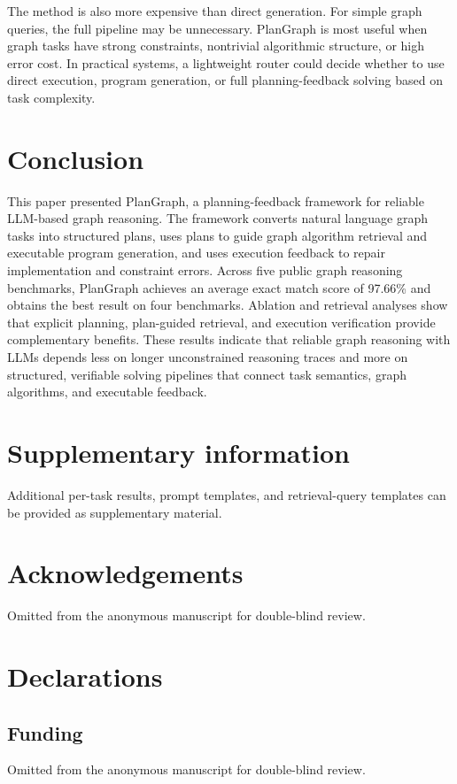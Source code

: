 \documentclass[pdflatex,iicol,sn-mathphys-num]{sn-jnl}
\theoremstyle{thmstyleone}
\theoremstyle{thmstyletwo}
\theoremstyle{thmstylethree}
\begin{document}
The method is also more expensive than direct generation. For simple graph queries, the full pipeline may be unnecessary. PlanGraph is most useful when graph tasks have strong constraints, nontrivial algorithmic structure, or high error cost. In practical systems, a lightweight router could decide whether to use direct execution, program generation, or full planning-feedback solving based on task complexity.

\section{Conclusion}\label{sec:conclusion}

This paper presented PlanGraph, a planning-feedback framework for reliable LLM-based graph reasoning. The framework converts natural language graph tasks into structured plans, uses plans to guide graph algorithm retrieval and executable program generation, and uses execution feedback to repair implementation and constraint errors. Across five public graph reasoning benchmarks, PlanGraph achieves an average exact match score of 97.66\% and obtains the best result on four benchmarks. Ablation and retrieval analyses show that explicit planning, plan-guided retrieval, and execution verification provide complementary benefits. These results indicate that reliable graph reasoning with LLMs depends less on longer unconstrained reasoning traces and more on structured, verifiable solving pipelines that connect task semantics, graph algorithms, and executable feedback.

\backmatter

\section*{Supplementary information}
Additional per-task results, prompt templates, and retrieval-query templates can be provided as supplementary material.

\section*{Acknowledgements}
Omitted from the anonymous manuscript for double-blind review.

\section*{Declarations}

\subsection*{Funding}
Omitted from the anonymous manuscript for double-blind review.
\end{document}
